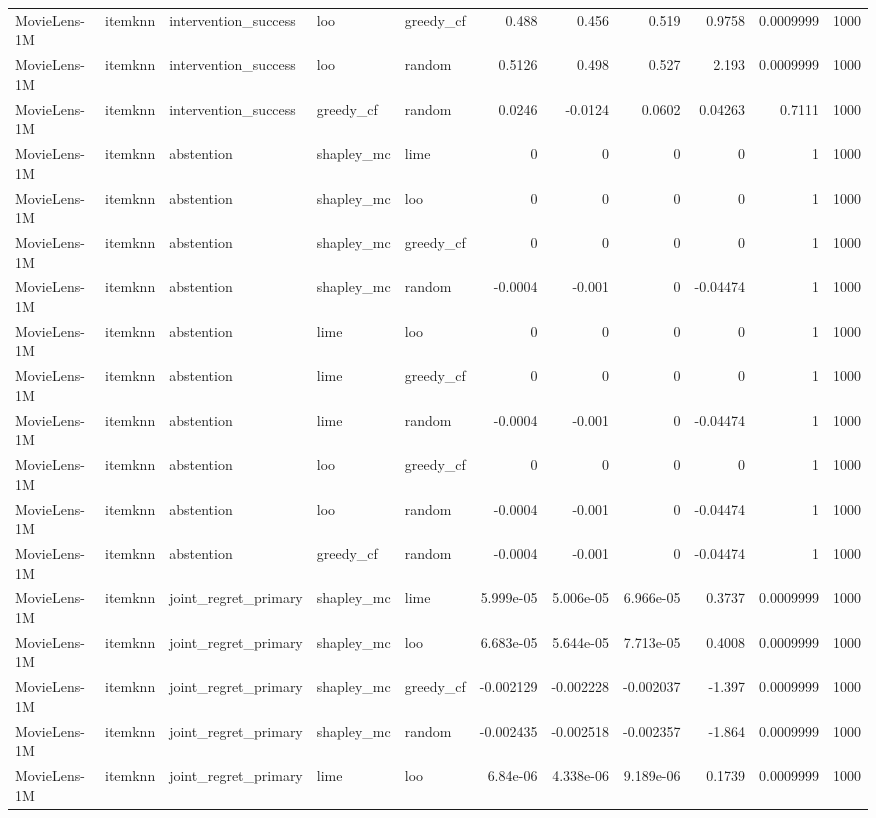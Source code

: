 \begin{table}[t]
\begin{tabular}{lllllrrrrrr}
MovieLens-1M & itemknn & intervention\_success & loo & greedy\_cf & 0.488 & 0.456 & 0.519 & 0.9758 & 0.0009999 & 1000 \\
MovieLens-1M & itemknn & intervention\_success & loo & random & 0.5126 & 0.498 & 0.527 & 2.193 & 0.0009999 & 1000 \\
MovieLens-1M & itemknn & intervention\_success & greedy\_cf & random & 0.0246 & -0.0124 & 0.0602 & 0.04263 & 0.7111 & 1000 \\
MovieLens-1M & itemknn & abstention & shapley\_mc & lime & 0 & 0 & 0 & 0 & 1 & 1000 \\
MovieLens-1M & itemknn & abstention & shapley\_mc & loo & 0 & 0 & 0 & 0 & 1 & 1000 \\
MovieLens-1M & itemknn & abstention & shapley\_mc & greedy\_cf & 0 & 0 & 0 & 0 & 1 & 1000 \\
MovieLens-1M & itemknn & abstention & shapley\_mc & random & -0.0004 & -0.001 & 0 & -0.04474 & 1 & 1000 \\
MovieLens-1M & itemknn & abstention & lime & loo & 0 & 0 & 0 & 0 & 1 & 1000 \\
MovieLens-1M & itemknn & abstention & lime & greedy\_cf & 0 & 0 & 0 & 0 & 1 & 1000 \\
MovieLens-1M & itemknn & abstention & lime & random & -0.0004 & -0.001 & 0 & -0.04474 & 1 & 1000 \\
MovieLens-1M & itemknn & abstention & loo & greedy\_cf & 0 & 0 & 0 & 0 & 1 & 1000 \\
MovieLens-1M & itemknn & abstention & loo & random & -0.0004 & -0.001 & 0 & -0.04474 & 1 & 1000 \\
MovieLens-1M & itemknn & abstention & greedy\_cf & random & -0.0004 & -0.001 & 0 & -0.04474 & 1 & 1000 \\
MovieLens-1M & itemknn & joint\_regret\_primary & shapley\_mc & lime & 5.999e-05 & 5.006e-05 & 6.966e-05 & 0.3737 & 0.0009999 & 1000 \\
MovieLens-1M & itemknn & joint\_regret\_primary & shapley\_mc & loo & 6.683e-05 & 5.644e-05 & 7.713e-05 & 0.4008 & 0.0009999 & 1000 \\
MovieLens-1M & itemknn & joint\_regret\_primary & shapley\_mc & greedy\_cf & -0.002129 & -0.002228 & -0.002037 & -1.397 & 0.0009999 & 1000 \\
MovieLens-1M & itemknn & joint\_regret\_primary & shapley\_mc & random & -0.002435 & -0.002518 & -0.002357 & -1.864 & 0.0009999 & 1000 \\
MovieLens-1M & itemknn & joint\_regret\_primary & lime & loo & 6.84e-06 & 4.338e-06 & 9.189e-06 & 0.1739 & 0.0009999 & 1000 \\

\end{tabular}
\end{table}
